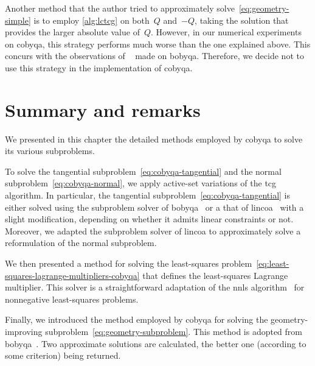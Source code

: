 Another method that the author tried to approximately solve~\cref{eq:geometry-simple} is to employ \cref{alg:lctcg} on both~$Q$ and~$-Q$, taking the solution that provides the larger absolute value of~$Q$.
However, in our numerical experiments on \gls{cobyqa}, this strategy performs much worse than the one explained above.
This concurs with the observations of \citeauthor{Powell_2008}~\cite{Powell_2008} made on \gls{bobyqa}.
Therefore, we decide not to use this strategy in the implementation of \gls{cobyqa}.

\section{Summary and remarks}

We presented in this chapter the detailed methods employed by \gls{cobyqa} to solve its various subproblems.

To solve the tangential subproblem~\cref{eq:cobyqa-tangential} and the normal subproblem~\cref{eq:cobyqa-normal}, we apply active-set variations of the \gls{tcg} algorithm.
In particular, the tangential subproblem~\cref{eq:cobyqa-tangential} is either solved using the subproblem solver of \gls{bobyqa}~\cite{Powell_2009} or a that of \gls{lincoa}~\cite{Powell_2015} with a slight modification, depending on whether it admits linear constraints or not.
Moreover, we adapted the subproblem solver of \gls{lincoa} to approximately solve a reformulation of the normal subproblem.

We then presented a method for solving the least-squares problem~\cref{eq:least-squares-lagrange-multipliers-cobyqa} that defines the least-squares Lagrange multiplier.
This solver is a straightforward adaptation of the \gls{nnls} algorithm~\cite[Alg.~23.10]{Lawson_Hanson_1987} for nonnegative least-squares problems.

Finally, we introduced the method employed by \gls{cobyqa} for solving the geometry-improving subproblem~\cref{eq:geometry-subproblem}.
This method is adopted from \gls{bobyqa}~\cite{Powell_2009}.
Two approximate solutions are calculated, the better one (according to some criterion) being returned.
